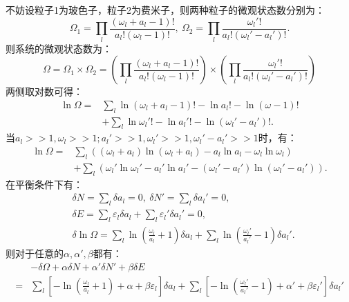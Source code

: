 \documentclass[a4paper,12pt]{article}
\begin{document}
\section{}
不妨设粒子1为玻色子，粒子2为费米子，则两种粒子的微观状态数分别为：
\begin{equation}\nonumber
	\Omega_1 = \prod_l \frac{(\omega_l + a_l - 1)!}{a_l!(\omega_l - 1)!}, ~ \Omega_2 = \prod_l \frac{\omega_l'!}{a_l!(\omega_l' - a_l')!}.
\end{equation}
则系统的微观状态数为：
\begin{equation}\nonumber
	\Omega = \Omega_1 \times \Omega_2 = \left( \prod_l \frac{(\omega_l + a_l - 1)!}{a_l!(\omega_l - 1)!} \right) \times \left( \prod_l \frac{\omega_l'!}{a_l!(\omega_l' - a_l')!} \right)
\end{equation}
两侧取对数可得：
\begin{equation}\nonumber
\begin{aligned}
	\ln \Omega =& \sum_l \ln(\omega_l + a_l - 1)! - \ln a_l! - \ln (\omega - 1)! \\ 
	&+ \sum_l \ln \omega_l'! - \ln a_l'! - \ln (\omega_l' - a_l')!.
\end{aligned}
\end{equation}
当$a_l>>1,\omega_l>>1;a_l'>>1,\omega_l'>>1,\omega_l'-a_l'>>1$时，有：
\begin{equation}\nonumber
\begin{aligned}
	\ln \Omega =& \sum_l \left( (\omega_l + a_l)\ln(\omega_l + a_l) - a_l\ln a_l - \omega_l \ln \omega_l \right) \\ 
	&+ \sum_l \left( \omega_l' \ln\omega_l' - a_l' \ln a_l' - (\omega_l' - a_l')\ln(\omega_l' - a_l') \right).
\end{aligned}
\end{equation}
在平衡条件下有：
\begin{equation}\nonumber
\begin{aligned}
	&\delta N = \sum_l \delta a_l = 0, ~ \delta N' = \sum_l \delta a_l' = 0, \\
	&\delta E = \sum_l \varepsilon_l \delta a_l + \sum_l \varepsilon_l' \delta a_l' = 0, \\
	&\delta \ln\Omega = \sum_l \ln\left( \frac{\omega_l}{a_l} + 1 \right) \delta a_l + \sum_l \ln\left( \frac{\omega_l'}{a_l'} - 1 \right) \delta a_l'.
\end{aligned}
\end{equation}
则对于任意的$\alpha, \alpha', \beta$都有：
\begin{equation}\nonumber
\begin{aligned}
	&-\delta \Omega + \alpha \delta N + \alpha' \delta N' + \beta \delta E \\
	=& \sum_l \left[ -\ln\left( \frac{\omega_l}{a_l} + 1 \right) + \alpha + \beta\varepsilon_l \right] \delta a_l + \sum_l \left[ -\ln\left( \frac{\omega_l'}{a_l'} - 1 \right) + \alpha' + \beta\varepsilon_l' \right] \delta a_l'
\end{aligned}
\end{equation}
\end{document}
